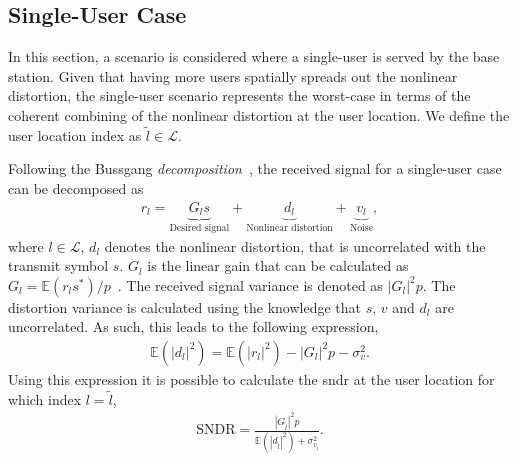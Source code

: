 \documentclass[conference]{IEEEtran}
\newcommand{\gilles}[1]{{\color{orange}[Gilles: #1]}}
\newcommand{\liesbet}[1]{{\color{olive}[Liesbet: #1]}}
\begin{document}


\subsection{Single-User Case}
 In this section, a scenario is considered where a single-user is served by the base station. Given that having more users spatially spreads out the nonlinear distortion, the single-user scenario represents the worst-case in terms of the coherent combining of the nonlinear distortion at the user location. We define the user location index as $\tilde{l} \in \mathcal{L}$.
 
 Following the Bussgang \textit{decomposition}~\cite{demir2020bussgang}, the received signal for a single-user case can be decomposed as
\begin{align}\label{eq:busgang-single-user}
    r_l = \underbrace{G_l s}_\text{Desired signal} + \underbrace{d_l}_\text{Nonlinear distortion} + \underbrace{v_l}_{\text{Noise}},
\end{align}
where $l\in \mathcal{L}$, $d_l$ denotes the nonlinear distortion, that is uncorrelated with the transmit symbol $s$. $G_l$ is the linear gain that can be calculated as $G_l=\mathbb{E}\left(r_l s^{*}\right) / p$~\cite{demir2020bussgang}. The received signal variance is denoted as $|G_l|^2p$. The distortion variance is calculated using the knowledge that $s$, $v$ and $d_l$ are uncorrelated. As such, this leads to the following expression,
\begin{align}\label{eq:distortion-single-user}
\mathbb{E}\left(|d_{l} |^{2}\right)=\mathbb{E}\left(|r_{l} |^{2}\right)-|G_{l} |^{2} p-\sigma_{v}^{2}.
\end{align}
Using this expression it is possible to calculate the \gls{sndr} at the user location for which index $l=\tilde{l}$,
\begin{align*}
\mathrm{SNDR} = \frac{|G_{\tilde{l}}|^{2} p}{\mathbb{E}\left(|d_{\tilde{l}}|^{2}\right)+\sigma_{v_{\tilde{l}}}^{2}}.
\end{align*}
\end{document}
